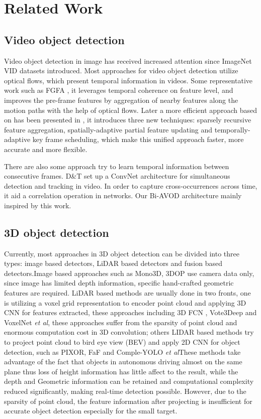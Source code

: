 \documentclass{bmvc2k}
\def\etal{\emph{et al}\bmvaOneDot}
\begin{document}
\section{Related Work}
\label{sec:related work}
\subsection{Video object detection}
Video object detection in image has received increased attention since ImageNet VID datasets introduced. Most approaches for video object detection utilize optical flows, which present temporal information in videos. Some representative work such as FGFA \cite{zhu2017flow}, it leverages temporal coherence on feature level, and improves the pre-frame features by aggregation of nearby features along the motion paths with the help of optical flows. Later a more efficient approach based on \cite{zhu2017flow} has been presented in \cite{zhu2018towards}, it introduces three new techniques: sparsely recursive feature aggregation, spatially-adaptive partial feature updating and temporally-adaptive key frame scheduling, which make this unified approach faster, more accurate and more flexible.

There are also some approach try to learn temporal information between consecutive frames. D\&T \cite{feichtenhofer2017detect} set up a ConvNet architecture for simultaneous detection and tracking in video. In order to capture cross-occurrences across time, it aid a correlation operation in networks. Our Bi-AVOD architecture mainly inspired by this work.

\subsection{3D object detection}
Currently, most approaches in 3D object detection can be divided into three types: image based detectors, LiDAR based detectors and fusion based detectors.Image based approaches such as Mono3D\cite{7780605}, 3DOP\cite{chen20183d} use camera data only, since image has limited depth information, specific hand-crafted geometric features are required. LiDAR based methods are usually done in two fronts, one is utilizing a voxel grid representation to encoder point cloud and applying 3D CNN for features extracted, these approaches including 3D FCN \cite{li20173d}, Vote3Deep \cite{engelcke2017vote3deep} and VoxelNet \cite{zhou2018voxelnet} \etal, these approaches suffer from the sparsity of point cloud and enormous computation cost in 3D convolution; others LIDAR based methods try to project point cloud to bird eye view (BEV) and apply 2D CNN for object detection, such as PIXOR\cite{yang2018pixor}, FaF\cite{luo2018fast} and Comple-YOLO \cite{simon2018complex} \etal These methods take advantage of the fact that objects in autonomous driving almost on the same plane thus loss of height information has little affect to the result, while the depth and Geometric information can be retained and computational complexity reduced significantly, making real-time detection possible. However, due to the sparsity of point cloud, the feature information after projecting is insufficient for accurate object detection especially for the small target.
\end{document}

